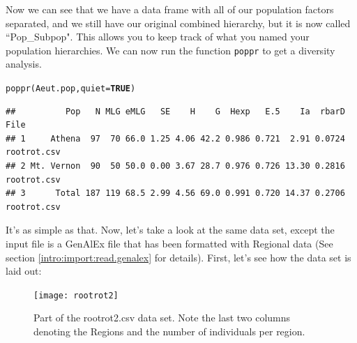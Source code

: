 \documentclass[letterpaper]{article}\usepackage[]{graphicx}\usepackage[]{color}
\makeatletter
\newcommand{\hlnum}[1]{\textcolor[rgb]{0.502,0,0.502}{\textbf{#1}}}%
\newcommand{\hlstd}[1]{\textcolor[rgb]{0,0,0}{#1}}%
\newcommand{\hlkwc}[1]{\textcolor[rgb]{0,0.502,0.753}{#1}}%
\newcommand{\hlkwd}[1]{\textcolor[rgb]{0,0.267,0.4}{#1}}%
\newenvironment{kframe}{%
 \def\at@end@of@kframe{}%
 \ifinner\ifhmode%
  \def\at@end@of@kframe{\end{minipage}}%
  \begin{minipage}{\columnwidth}%
 \fi\fi%
 \def\FrameCommand##1{\hskip\@totalleftmargin \hskip-\fboxsep
 \colorbox{shadecolor}{##1}\hskip-\fboxsep
     \hskip-\linewidth \hskip-\@totalleftmargin \hskip\columnwidth}%
 \MakeFramed {\advance\hsize-\width
   \@totalleftmargin\z@ \linewidth\hsize
   \@setminipage}}%
 {\par\unskip\endMakeFramed%
 \at@end@of@kframe}
\newenvironment{knitrout}{}{} %
\makeatother
\begin{document}
Now we can see that we have a data frame with all of our population factors separated, and we still have our original combined hierarchy, but it is now called ``Pop\_Subpop". This allows you to keep track of what you named your population hierarchies. We can now run the function \texttt{poppr} to get a diversity analysis.
\begin{knitrout}\footnotesize
{}\color{fgcolor}\begin{kframe}
\begin{alltt}
\hlkwd{poppr}\hlstd{(Aeut.pop,} \hlkwc{quiet} \hlstd{=} \hlnum{TRUE}\hlstd{)}
\end{alltt}
\begin{verbatim}
##          Pop   N MLG eMLG   SE    H    G  Hexp   E.5    Ia  rbarD        File
## 1     Athena  97  70 66.0 1.25 4.06 42.2 0.986 0.721  2.91 0.0724 rootrot.csv
## 2 Mt. Vernon  90  50 50.0 0.00 3.67 28.7 0.976 0.726 13.30 0.2816 rootrot.csv
## 3      Total 187 119 68.5 2.99 4.56 69.0 0.991 0.720 14.37 0.2706 rootrot.csv
\end{verbatim}
\end{kframe}
\end{knitrout}

It's as simple as that. Now, let's take a look at the same data set, except the input file is a GenAlEx file that has been formatted with Regional data (See section \ref{intro:import:read.genalex} for details). First, let's see how the data set is laid out:


\begin{figure}[h!]
  \centering
  \caption{\footnotesize \footnotesize Part of the rootrot2.csv data set. Note the last two columns denoting the Regions and the number of individuals per region.}
  \label{rootrot2_csv}
\texttt{[image: rootrot2]}
\end{figure}

\begin{center}
\end{center}
\end{document}
